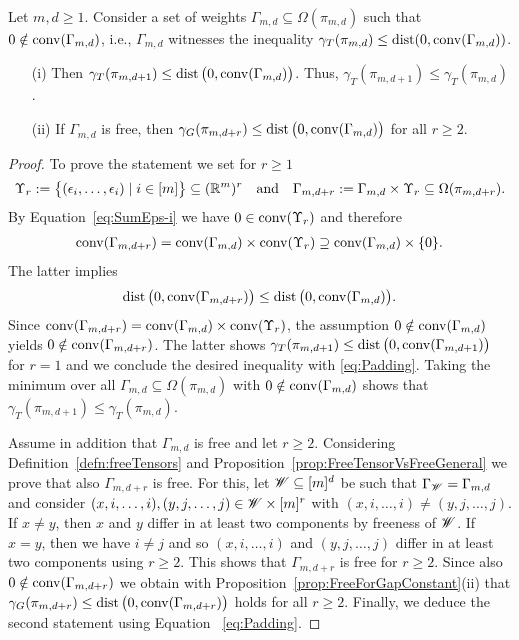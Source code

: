 \begin{prop} \label{prop:dTensorsPadding}
	Let $m,d \geq 1$. Consider a set of weights $\Gamma_{m,d} \subseteq \Omega(\pi_{m,d})$ such that $0 \notin \operatorname{conv}(\Gamma_{m,d})$, i.e., $\Gamma_{m,d}$ witnesses the inequality $\gamma_{T}(\pi_{m,d}) \leq \operatorname{dist} (0, \operatorname{conv}(\Gamma_{m,d}))$.
	\begin{itemize}
		\item[(i)] Then $\gamma_{T}(\pi_{m,d+1}) \leq \operatorname{dist} \big(0, \operatorname{conv}(\Gamma_{m,d}) \big)$. Thus, $\gamma_{T}(\pi_{m,d+1}) \leq \gamma_{T}(\pi_{m,d})$.
		\item[(ii)] If $\Gamma_{m,d}$ is free, then $\gamma_{G}(\pi_{m,d+r}) \leq \operatorname{dist} \big(0, \operatorname{conv}(\Gamma_{m,d}) \big)$ for all $r \geq 2$.
	\end{itemize}
\end{prop}

\begin{proof}
	To prove the statement we set for $r \geq 1 $
	\[ \Upsilon_r := \big\{ (\epsilon_i,\ldots,\epsilon_i) \mid i \in [m] \big\} \subseteq (\mathbb R^m)^r \quad \text{and} \quad
	\Gamma_{m,d+r} := \Gamma_{m,d} \times \Upsilon_r \subseteq \Omega(\pi_{m,d+r}) . \]
	By Equation~\eqref{eq:SumEps-i} we have $0 \in \operatorname{conv}(\Upsilon_r)$ and therefore
	\begin{align*}
		\operatorname{conv}(\Gamma_{m,d+r}) = \operatorname{conv}(\Gamma_{m,d}) \times \operatorname{conv}(\Upsilon_r)
		\supseteq \operatorname{conv}(\Gamma_{m,d}) \times \{0\}.
	\end{align*}
	The latter implies
	\begin{equation}\label{eq:Padding}
		\operatorname{dist} \big( 0, \operatorname{conv}(\Gamma_{m,d+r}) \big) \leq \operatorname{dist} \big( 0, \operatorname{conv}(\Gamma_{m,d}) \big).
	\end{equation}
	Since $\operatorname{conv}(\Gamma_{m,d+r}) = \operatorname{conv}(\Gamma_{m,d}) \times \operatorname{conv}(\Upsilon_r)$, the assumption $0 \notin \operatorname{conv}(\Gamma_{m,d})$ yields $0 \notin \operatorname{conv}(\Gamma_{m,d+r})$. The latter shows $\gamma_{T}(\pi_{m,d+1}) \leq \operatorname{dist} \big(0, \operatorname{conv}(\Gamma_{m,d + 1}) \big)$ for $r=1$ and we conclude the desired inequality with \eqref{eq:Padding}. Taking the minimum over all $\Gamma_{m,d} \subseteq \Omega(\pi_{m,d})$ with $0 \notin \operatorname{conv}(\Gamma_{m,d})$ shows that $\gamma_{T}(\pi_{m,d+1}) \leq \gamma_{T}(\pi_{m,d})$.
	
	Assume in addition that $\Gamma_{m,d}$ is free and let $r \geq 2$. Considering Definition~\ref{defn:freeTensors} and Proposition~\ref{prop:FreeTensorVsFreeGeneral} we prove that also $\Gamma_{m,d+r}$ is free. For this, let $\mathscr{W} \subseteq [m]^d$ be such that $\Gamma_{\mathscr{W}} = \Gamma_{m,d}$ and consider $(x,i,\ldots,i), (y,j,\ldots,j) \in \mathscr{W} \times [m]^r$ with $(x,i,\ldots,i) \neq (y,j,\ldots,j)$. If $x \neq y$, then $x$ and $y$ differ in at least two components by freeness of $\mathscr{W}$. If $x = y$, then we have $i \neq j$ and so $(x,i,\ldots,i)$ and $(y,j,\ldots,j)$ differ in at least two components using $r \geq 2$. This shows that $\Gamma_{m,d+r}$ is free for $r \geq 2$. Since also $0 \notin \operatorname{conv}(\Gamma_{m,d+r})$ we obtain with Proposition~\ref{prop:FreeForGapConstant}(ii) that $\gamma_{G}(\pi_{m,d+r}) \leq \operatorname{dist} \big(0, \operatorname{conv}(\Gamma_{m,d + r}) \big)$ holds for all $r \geq 2$. Finally, we deduce the second statement using Equation~ \eqref{eq:Padding}.
\end{proof}


